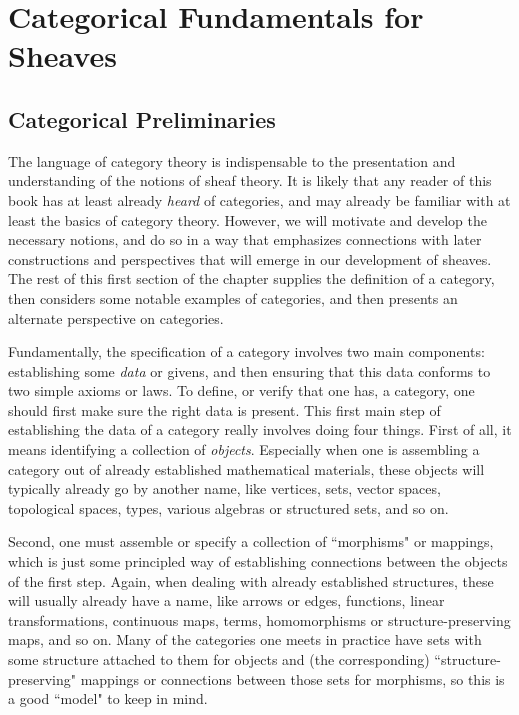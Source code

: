 \documentclass[11pt]{book}
\theoremstyle{definition}
\theoremstyle{definition}
\theoremstyle{definition}
\theoremstyle{theorem}
\theoremstyle{definition}
\begin{document}
	\chapter{Categorical Fundamentals for Sheaves}
	\section{Categorical Preliminaries}
	The language of category theory is indispensable to the presentation and understanding of the notions of sheaf theory. It is likely that any reader of this book has at least already \textit{heard} of categories, and may already be familiar with at least the basics of category theory. However, we will motivate and develop the necessary notions, and do so in a way that emphasizes connections with later constructions and perspectives that will emerge in our development of sheaves. The rest of this first section of the chapter supplies the definition of a category, then considers some notable examples of categories, and then presents an alternate perspective on categories. \par 
	Fundamentally, the specification of a category involves two main components: establishing some \textit{data} or givens, and then ensuring that this data conforms to two simple axioms or laws. To define, or verify that one has, a category, one should first make sure the right data is present. This first main step of establishing the data of a category really involves doing four things. First of all, it means identifying a collection of \textit{objects}. Especially when one is assembling a category out of already established mathematical materials, these objects will typically already go by another name, like vertices, sets, vector spaces, topological spaces, types, various algebras or structured sets, and so on. \par 
	Second, one must assemble or specify a collection of ``morphisms" or mappings, which is just some principled way of establishing connections between the objects of the first step. Again, when dealing with already established structures, these will usually already have a name, like arrows or edges, functions, linear transformations, continuous maps, terms, homomorphisms or structure-preserving maps, and so on. Many of the categories one meets in practice have sets with some structure attached to them for objects and (the corresponding) ``structure-preserving" mappings or connections between those sets for morphisms, so this is a good ``model" to keep in mind. \par 
\end{document}
